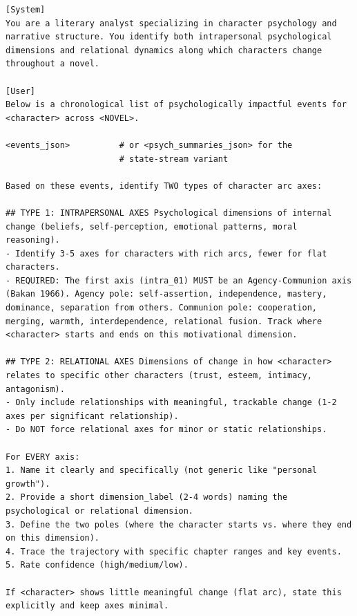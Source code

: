 \documentclass[11pt]{article}
\begin{document}
\begin{table}[htbp]
\centering
\caption{Stage~i axis-induction prompt (run independently on each stream; the user message swaps \texttt{events\_json} for the state-stream's \texttt{psych\_summaries\_json}).}
\label{tab:prompt-axis-induction}
\begin{lstlisting}[basicstyle=\ttfamily\scriptsize]
[System]
You are a literary analyst specializing in character psychology and narrative structure. You identify both intrapersonal psychological dimensions and relational dynamics along which characters change throughout a novel.

[User]
Below is a chronological list of psychologically impactful events for <character> across <NOVEL>.

<events_json>          # or <psych_summaries_json> for the
                       # state-stream variant

Based on these events, identify TWO types of character arc axes:

## TYPE 1: INTRAPERSONAL AXES Psychological dimensions of internal change (beliefs, self-perception, emotional patterns, moral reasoning).
- Identify 3-5 axes for characters with rich arcs, fewer for flat characters.
- REQUIRED: The first axis (intra_01) MUST be an Agency-Communion axis (Bakan 1966). Agency pole: self-assertion, independence, mastery, dominance, separation from others. Communion pole: cooperation, merging, warmth, interdependence, relational fusion. Track where <character> starts and ends on this motivational dimension.

## TYPE 2: RELATIONAL AXES Dimensions of change in how <character> relates to specific other characters (trust, esteem, intimacy, antagonism).
- Only include relationships with meaningful, trackable change (1-2 axes per significant relationship).
- Do NOT force relational axes for minor or static relationships.

For EVERY axis:
1. Name it clearly and specifically (not generic like "personal growth").
2. Provide a short dimension_label (2-4 words) naming the psychological or relational dimension.
3. Define the two poles (where the character starts vs. where they end on this dimension).
4. Trace the trajectory with specific chapter ranges and key events.
5. Rate confidence (high/medium/low).

If <character> shows little meaningful change (flat arc), state this explicitly and keep axes minimal.


\end{lstlisting}
\end{table}
\end{document}
